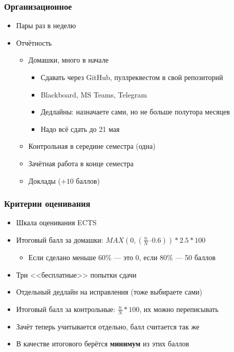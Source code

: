 \documentclass[xetex,mathserif,serif]{beamer}
\begin{document}
    \begin{frame}
        \frametitle{Организационное}
        \begin{itemize}
            \item Пары раз в неделю
            \item Отчётность
            \begin{itemize}
                \item Домашки, много в начале
                \begin{itemize}
                    \item Сдавать через GitHub, пуллреквестом в свой репозиторий
                    \item Blackboard, MS Teams, Telegram
                    \item Дедлайны: назначаете сами, но не больше полутора месяцев
                    \item Надо всё сдать до 21 мая
                \end{itemize}
                \item Контрольная в середине семестра (одна)
                \item Зачётная работа в конце семестра
                \item Доклады ($+10$ баллов)
            \end{itemize}
        \end{itemize}
    \end{frame}

    \begin{frame}
        \frametitle{Критерии оценивания}
        \begin{itemize}
            \item Шкала оценивания ECTS
            \item Итоговый балл за домашки: $MAX(0, (\frac{n}{N} – 0.6)) * 2.5 * 100$
            \begin{itemize}
                \item Если сделано меньше 60\% --- это 0, если 80\% --- 50 баллов
            \end{itemize}
            \item Три <<бесплатные>> попытки сдачи
            \item Отдельный дедлайн на исправления (тоже выбираете сами)
            \item Итоговый балл за контрольные: $\frac{n}{N} * 100$, их можно переписывать
            \item Зачёт теперь учитывается отдельно, балл считается так же
            \item В качестве итогового берётся \textbf{минимум} из этих баллов
        \end{itemize}
    \end{frame}
\end{document}
